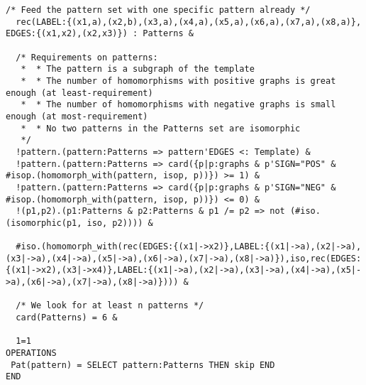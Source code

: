 \begin{lstlisting}[caption=ProB specification (without dataset), style=model]
  /* Feed the pattern set with one specific pattern already */
  rec(LABEL:{(x1,a),(x2,b),(x3,a),(x4,a),(x5,a),(x6,a),(x7,a),(x8,a)}, EDGES:{(x1,x2),(x2,x3)}) : Patterns &

  /* Requirements on patterns:
   *  * The pattern is a subgraph of the template
   *  * The number of homomorphisms with positive graphs is great enough (at least-requirement)
   *  * The number of homomorphisms with negative graphs is small enough (at most-requirement)
   *  * No two patterns in the Patterns set are isomorphic
   */
  !pattern.(pattern:Patterns => pattern'EDGES <: Template) &
  !pattern.(pattern:Patterns => card({p|p:graphs & p'SIGN="POS" & #isop.(homomorph_with(pattern, isop, p))}) >= 1) &
  !pattern.(pattern:Patterns => card({p|p:graphs & p'SIGN="NEG" & #isop.(homomorph_with(pattern, isop, p))}) <= 0) &
  !(p1,p2).(p1:Patterns & p2:Patterns & p1 /= p2 => not (#iso.(isomorphic(p1, iso, p2)))) &

  #iso.(homomorph_with(rec(EDGES:{(x1|->x2)},LABEL:{(x1|->a),(x2|->a),(x3|->a),(x4|->a),(x5|->a),(x6|->a),(x7|->a),(x8|->a)}),iso,rec(EDGES:{(x1|->x2),(x3|->x4)},LABEL:{(x1|->a),(x2|->a),(x3|->a),(x4|->a),(x5|->a),(x6|->a),(x7|->a),(x8|->a)}))) & 

  /* We look for at least n patterns */
  card(Patterns) = 6 &

  1=1
OPERATIONS
 Pat(pattern) = SELECT pattern:Patterns THEN skip END
END
\end{lstlisting}


